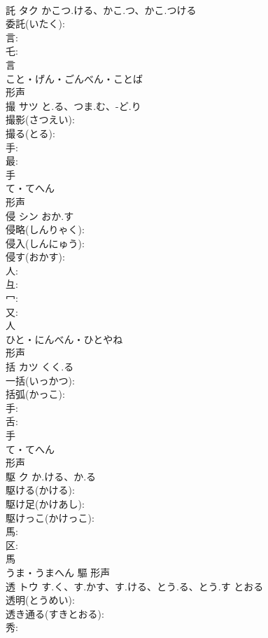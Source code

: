 \documentclass[8pt]{extreport}
\begin{document}
\begin{CJK}{UTF8}{min}
\\	託	タク	かこつ.ける、かこ.つ、かこ.つける		
\\	委託(いたく): 
\\	言: 
\\	乇: 
\\	言	
\\	こと・げん・ごんべん・ことば	
\\	形声 
\\	撮	サツ	と.る、つま.む、-ど.り		
\\	撮影(さつえい): 
\\	撮る(とる): 
\\	手: 
\\	最: 
\\	手	
\\	て・てへん	
\\	形声 
\\	侵	シン	おか.す		
\\	侵略(しんりゃく): 
\\	侵入(しんにゅう): 
\\	侵す(おかす): 
\\	人: 
\\	彑: 
\\	冖: 
\\	又: 
\\	人	
\\	ひと・にんべん・ひとやね	
\\	形声 
\\	括	カツ	くく.る		
\\	一括(いっかつ): 
\\	括弧(かっこ): 
\\	手: 
\\	舌: 
\\	手	
\\	て・てへん	
\\	形声 
\\	駆	ク	か.ける、か.る		
\\	駆ける(かける): 
\\	駆け足(かけあし): 
\\	駆けっこ(かけっこ): 
\\	馬: 
\\	区: 
\\	馬	
\\	うま・うまへん	驅	形声 
\\	透	トウ	す.く、す.かす、す.ける、とう.る、とう.す	とおる	
\\	透明(とうめい): 
\\	透き通る(すきとおる): 
\\	秀: 

\end{CJK}
\end{document}
